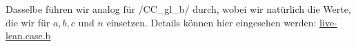 \documentclass[10pt]{article}
\begin{document}
\noindent Dasselbe führen wir analog für \lean/CC_gl_b/ durch, wobei wir natürlich die Werte, die wir für $a,b,c$ und $n$ einsetzen. Details können hier eingesehen werden: \href{https://live.lean-lang.org/#code=import%20Mathlib.Tactic%0D%0Aimport%20Mathlib.GroupTheory.Subgroup.Basic%0D%0Aimport%20Mathlib.Data.Matrix.Notation%0D%0Aimport%20Mathlib.Data.Matrix.Basic%0D%0Aimport%20Mathlib.Data.Nat.Basic%0D%0Aimport%20Mathlib.Data.Real.Basic%0D%0Aimport%20Mathlib.Data.Real.Sqrt%0D%0A%0D%0Aimport%20Mathlib.LinearAlgebra.Matrix.NonsingularInverse%0D%0Aimport%20Mathlib.LinearAlgebra.Matrix.GeneralLinearGroup%0D%0A%0D%0Aimport%20Mathlib.Data.Matrix.Reflection%0D%0A%0D%0Aset_option%20maxHeartbeats%200%0D%0A%0D%0A%0D%0Anoncomputable%20section%0D%0Adef%20CC_matrix_b%20%20%20%3A%20Matrix%20(Fin%203)%20(Fin%203)%20Real%20%3A%3D%20!!%5B1%2F3%2C%20-2%2F3*Real.sqrt%202%2C%200%3B%20(2%2F3*Real.sqrt%202)%2C%201%2F3%2C%200%3B%200%2C%200%2C%201%5D%0D%0Aend%20noncomputable%20section%0D%0A%0D%0A%0D%0Atheorem%20CC_matrix_b_det_neq_zero%20%3A%20Matrix.det%20CC_matrix_b%20%E2%89%A0%200%20%3A%3D%20by%0D%0A%20%20rw%20%5BCC_matrix_b%5D%0D%0A%20%20rw%20%5BMatrix.det_fin_three%5D%0D%0A%20%20simp%0D%0A%20%20norm_num%0D%0A%20%20ring_nf%0D%0A%20%20simp%0D%0A%20%20rw%20%5BReal.sq_sqrt%5D%0D%0A%20%20norm_num%0D%0A%20%20norm_num%0D%0A%0D%0A%0D%0A%0D%0Anoncomputable%20section%0D%0Adef%20CC_gl_b%20%20%20%3A%20GL%20(Fin%203)%20Real%20%3A%3D%20Matrix.GeneralLinearGroup.mkOfDetNeZero%20CC_matrix_b%20CC_matrix_b_det_neq_zero%0D%0Aend%20noncomputable%20section%0D%0A%0D%0A%0D%0A%0D%0Atheorem%20CC_coe_gl_b_eq_matrix_b%20%3A%20%E2%86%91CC_gl_b%20%3D%20CC_matrix_b%20%3A%3D%20by%0D%0A%20%20rfl%0D%0A%0D%0A%0D%0Aabbrev%20r_3%20%3A%3D%20Fin%203%20-%3E%20%E2%84%9D%0D%0A%0D%0Adef%20CC_rotate%20(p%20%3A%20GL%20(Fin%203)%20Real)%20(vec%20%3A%20r_3)%20%3A%20r_3%20%3A%3D%0D%0A%20%20(p%20%3A%20Matrix%20(Fin%203)%20(Fin%203)%20Real).vecMul%20vec%0D%0A%0D%0A%0D%0Adef%20CC_a_b_c_vec%20(a%20b%20c%20%3A%20%E2%84%A4)%20(n%20%3A%20Nat)%20%3A%20r_3%20%3A%3D%0D%0A%20%20%20!%5B1%2F3%5En%20*%20a%20*%20Real.sqrt%202%2C1%2F3%5En%20*%20b%2C1%2F3%5En%20*%20c%20*%20Real.sqrt%202%5D%0D%0A%0D%0A%0D%0Adef%20CC_zero_one_zero%20%3A%20r_3%20%3A%3D%20!%5B0%2C1%2C0%5D%0D%0A%0D%0A%0D%0A%0D%0Atheorem%20CC_case_b%20(x)%20(h%3A%20x%20%3D%20CC_gl_b)%3A%20%E2%88%83%20a%20b%20c%20%3A%20%E2%84%A4%2C%20%E2%88%83%20n%20%3A%20%E2%84%95%2C%20CC_rotate%20x%20CC_zero_one_zero%20%3D%20CC_a_b_c_vec%20a%20b%20c%20n%20%3A%3D%20by%0D%0A%20%20%20%20rw%20%5Bh%5D%0D%0A%20%20%20%20rw%20%5BCC_rotate%5D%0D%0A%20%20%20%20rw%20%5BCC_coe_gl_b_eq_matrix_b%5D%0D%0A%20%20%20%20rw%20%5BCC_zero_one_zero%5D%0D%0A%20%20%20%20rw%20%5BCC_matrix_b%5D%0D%0A%20%20%20%20use%202%0D%0A%20%20%20%20use%201%0D%0A%20%20%20%20use%200%0D%0A%20%20%20%20use%201%0D%0A%20%20%20%20rw%20%5BCC_a_b_c_vec%5D%0D%0A%20%20%20%20simp%0D%0A%20%20%20%20norm_num}{live-lean.case.b}
\end{document}

